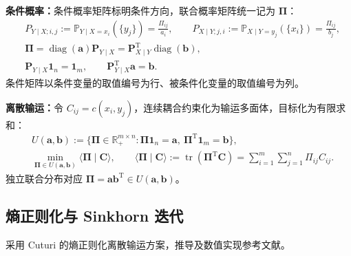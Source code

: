 \textbf{条件概率：}条件概率矩阵标明条件方向，联合概率矩阵统一记为 $\bm\Pi$：
\begin{equation}\label{cw:eq:conditional-matrices}
\begin{aligned}
&P_{Y\mid X;i,j}:=\mathbb P_{Y\mid X=x_i}(\{y_j\})=\frac{\Pi_{ij}}{a_i},\qquad
P_{X\mid Y;j,i}:=\mathbb P_{X\mid Y=y_j}(\{x_i\})=\frac{\Pi_{ij}}{b_j},\\
&\bm\Pi=\operatorname{diag}(\bm a)\bm P_{Y\mid X}
=\bm P_{X\mid Y}^{\mathrm T}\operatorname{diag}(\bm b),\\
&\bm P_{Y\mid X}\mathbf1_n=\mathbf1_m,\qquad
\bm P_{Y\mid X}^{\mathrm T}\bm a=\bm b.
\end{aligned}
\end{equation}
条件矩阵以条件变量的取值编号为行、被条件化变量的取值编号为列。

\textbf{离散输运：}令 $C_{ij}=c(x_i,y_j)$，连续耦合约束化为输运多面体，目标化为有限求和：
\begin{equation}\label{cw:eq:transport-polytope}
\begin{aligned}
&U(\bm a,\bm b):=\{\bm\Pi\in\mathbb R_+^{m\times n}:
\bm\Pi\mathbf1_n=\bm a,\ \bm\Pi^{\mathrm T}\mathbf1_m=\bm b\},\\
&\min_{\bm\Pi\in U(\bm a,\bm b)}\langle\bm\Pi\mid\bm C\rangle,
\qquad\langle\bm\Pi\mid\bm C\rangle:=\operatorname{tr}(\bm\Pi^{\mathrm T}\bm C)=\sum_{i=1}^m\sum_{j=1}^n\Pi_{ij}C_{ij}.
\end{aligned}
\end{equation}
独立联合分布对应 $\bm\Pi=\bm a\bm b^{\mathrm T}\in U(\bm a,\bm b)$。

\subsection{熵正则化与 Sinkhorn 迭代}\label{cw:sec:sinkhorn}

采用 Cuturi 的熵正则化离散输运方案\cite{cuturi2013sinkhorn}，推导及数值实现参考文献\cite{peyre2019computational}。

